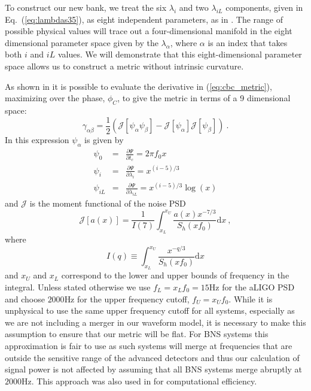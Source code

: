 To construct our new bank, we treat the six $\lambda_i$ and two $\lambda_{i L}$ components, given in
Eq.~(\ref{eq:lambdas35}), as eight independent parameters, as in \cite{Pai:2012mv}.
The range of
possible physical values will trace out a four-dimensional manifold in the
eight dimensional parameter space given by the $\lambda_\alpha$, where $\alpha$ is an index that takes both $i$ and $i L$ values. We will demonstrate
that this eight-dimensional parameter space allows us to construct a metric
without intrinsic curvature.

As shown in \cite{Owen96} it is possible to evaluate the derivative in (\ref{eq:cbc_metric}),
maximizing over the phase, $\phi_C$, to give the metric in terms of a 9 dimensional space:
%
\begin{equation}
\gamma_{\alpha \beta} = \frac{1}{2} \left( \mathcal{J}[\psi_\alpha \psi_\beta] - \mathcal{J}[\psi_\alpha] \mathcal{J}[\psi_\beta] \right) ~.
\end{equation}
%
In this expression $\psi_{\alpha}$ is given by
%
\begin{eqnarray}
\psi_0 &=& \frac{\partial \Psi}{\partial t_c} = 2 \pi f_0 x \\
\psi_i &=& \frac{\partial \Psi}{\partial \lambda_i} = x^{(i-5)/3} \\
\psi_{i L} &=& \frac{\partial \Psi}{\partial \lambda_{i L}} = x^{(i-5)/3} \log(x)
\end{eqnarray}
%
and $\mathcal{J}$ is the moment functional of the noise PSD \cite{PW95,Owen96}
%
\begin{equation}
\mathcal{J}[ a(x) ] = \frac{1}{I(7)} \int_{x_L}^{x_U} \frac{a(x) x^{-7/3}}{S_h(x f_0)} \mathrm{d}x ~,
\end{equation}
%
where
%
\begin{equation}
I(q) \equiv \int_{x_L}^{x_U} \frac{x^{-q/3}}{S_h(x f_0)} \mathrm{d}x
\end{equation}
%
and $x_U$ and $x_L$ correspond to the lower and upper bounds of frequency in the integral. Unless stated
otherwise we use $f_L = x_L f_0 = 15\mathrm{Hz}$ for the aLIGO PSD and choose $2000$Hz
for the upper frequency cutoff, $f_U = x_U f_0$. While it is unphysical
to use the same upper frequency cutoff for all systems, especially as we are not including a merger in our
waveform model, it is necessary to make this assumption to ensure that our metric will be flat. For BNS systems
this approximation is fair to use
as such systems will merge at frequencies that are outside the sensitive range of the advanced detectors and
thus our calculation of signal power is not affected by assuming that all BNS systems merge abruptly at $2000$Hz.
This approach
was also used in \cite{Bank06} for computational efficiency.

